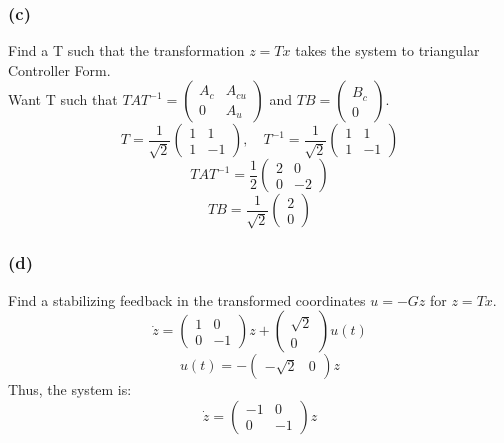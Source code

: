 \documentclass{article}
\begin{document}
\subsubsection*{(c)}
Find a T such that the transformation $z=Tx$ takes the system to triangular Controller Form.\\
Want T such that $TAT^{-1}=\begin{pmatrix}A_c&A_{cu}\\0&A_u\end{pmatrix}$ and $TB=\begin{pmatrix}B_c\\0\end{pmatrix}$.
\[T=\frac{1}{\sqrt{2}}\begin{pmatrix}1&1\\1&-1\end{pmatrix},\quad T^{-1}=\frac{1}{\sqrt{2}}\begin{pmatrix}1&1\\1&-1\end{pmatrix}\]
\[TAT^{-1}=\frac{1}{2}\begin{pmatrix}2&0\\0&-2\end{pmatrix}\]
\[TB=\frac{1}{\sqrt{2}}\begin{pmatrix}2\\0\end{pmatrix}\]
\subsubsection*{(d)}
Find a stabilizing feedback in the transformed coordinates $u=-Gz$ for $z=Tx$.\\
\[\dot{z}=\begin{pmatrix}1&0\\0&-1\end{pmatrix}z+\begin{pmatrix}\sqrt{2}\\0\end{pmatrix}u(t)\]
\[u(t)=-\begin{pmatrix}-\sqrt{2}&0\end{pmatrix}z\]
Thus, the system is:
\[\dot{z}=\begin{pmatrix}-1&0\\0&-1\end{pmatrix}z\]
\end{document}

